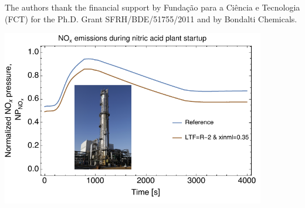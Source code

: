 \documentclass[journal=jacsat,manuscript=article]{achemso}
\newcommand{\nox}{\ce{NO_{\rmfamily{x}}}}
\begin{document}
\begin{acknowledgement}

The authors thank the financial support by Funda\c c\~ao para a Ci\^encia e Tecnologia (FCT) for the Ph.D. Grant SFRH/BDE/51755/2011 and by Bondalti Chemicals.


\end{acknowledgement}








\makeatletter
\setlength\acs@tocentry@height{8.25cm}
\setlength\acs@tocentry@width{4.45cm}
\makeatother

\begin{tocentry}

\begin{center}
\includegraphics[width=0.865\textwidth]{graphicalfigure}
\end{center}


\end{tocentry}

\end{document}
